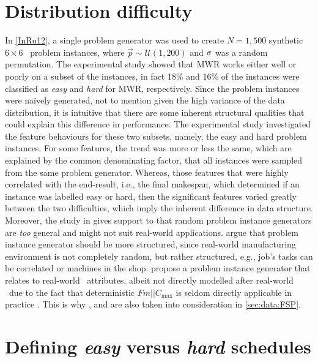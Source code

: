 \section{Distribution difficulty}
In \cref{InRu12}, a single problem generator was used to create  $N=1,500$ 
synthetic $6\times6$ \jsp\ problem instances, where 
$\vec{p}\sim\mathcal{U}(1,200)$ and ${\mathbf{\sigma}}$ was a random permutation. The 
experimental study showed that MWR works either well or poorly on a subset of 
the instances, in fact 18\% and 16\% of the instances were classified as 
\emph{easy} and \emph{hard} for MWR, respectively. 
Since the problem instances were na\"{i}vely generated, not to mention given 
the high variance of the data distribution, it is intuitive that there are some 
inherent structural qualities that could explain this difference in 
performance. The experimental study investigated the feature behaviours for 
these two subsets, namely, the easy and hard problem instances. For some 
features, the trend was more or less the same, which are explained by the 
common denominating factor, that all instances were sampled from the same 
problem generator. Whereas, those features that were highly correlated with the 
end-result, i.e., the final makespan, which determined if an instance was 
labelled easy or hard, then the significant features varied greatly between the 
two difficulties, which imply the inherent difference in data structure. 
Moreover, the study in gives support to that random problem instance generators 
are \emph{too} general and might not suit real-world applications. 
\citet{Whitley} argue that problem instance generator should be more 
structured, since real-world manufacturing environment is not completely 
random, but rather structured, e.g.,  job's tasks can be correlated or machines 
in the shop. \citeauthor{Whitley} propose a problem instance generator that 
relates to real-world \fsp\ attributes, albeit not directly modelled after 
real-world \fsp\ due to the fact that deterministic $Fm||C_{\max}$ is seldom 
directly applicable in practice \citep{Dudek92}. This is why , 
 and  are also taken into consideration in 
\cref{sec:data:FSP}.

\section{Defining \emph{easy} versus \emph{hard} schedules} 
\label{sec:diff:easyhard}

